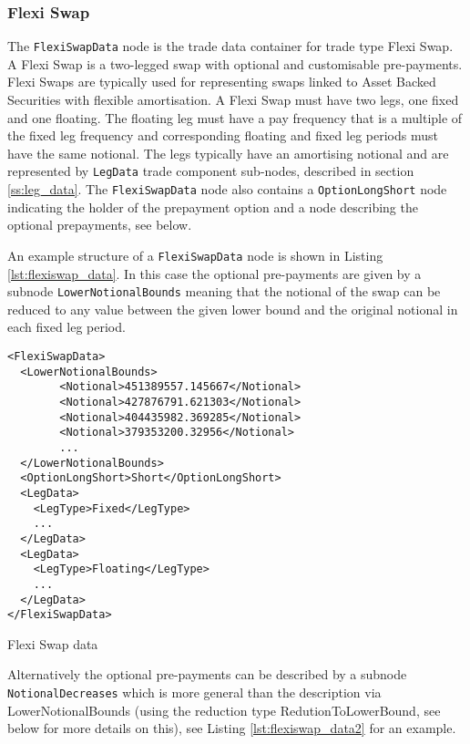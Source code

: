 \subsubsection{Flexi Swap}

The \lstinline!FlexiSwapData! node is the trade data container for trade type Flexi Swap. A Flexi Swap is a two-legged
swap with optional and customisable pre-payments. Flexi Swaps are typically used for representing swaps linked to Asset
Backed Securities with flexible amortisation. A Flexi Swap must have two legs, one fixed and one floating. The floating
leg must have a pay frequency that is a multiple of the fixed leg frequency and corresponding floating and fixed leg
periods must have the same notional. The legs typically have an amortising notional and are represented by
\lstinline!LegData! trade component sub-nodes, described in section \ref{ss:leg_data}. The \lstinline!FlexiSwapData!
node also contains a \lstinline!OptionLongShort! node indicating the holder of the prepayment option and a node
describing the optional prepayments, see below.

An example structure of a \lstinline!FlexiSwapData! node is shown in Listing \ref{lst:flexiswap_data}. In this case the
optional pre-payments are given by a subnode \lstinline!LowerNotionalBounds!  meaning that the notional of the swap can
be reduced to any value between the given lower bound and the original notional in each fixed leg period.

\begin{listing}[H]
\begin{verbatim}
<FlexiSwapData>
  <LowerNotionalBounds>
        <Notional>451389557.145667</Notional>
        <Notional>427876791.621303</Notional>
        <Notional>404435982.369285</Notional>
        <Notional>379353200.32956</Notional>
        ...
  </LowerNotionalBounds>
  <OptionLongShort>Short</OptionLongShort>
  <LegData>
    <LegType>Fixed</LegType>
    ...
  </LegData>
  <LegData>
    <LegType>Floating</LegType>
    ...
  </LegData>
</FlexiSwapData>
\end{verbatim}
\caption{Flexi Swap data}
\label{lst:flexiswap_data}
\end{listing}

Alternatively the optional pre-payments can be described by a subnode \lstinline!NotionalDecreases! which is more
general than the description via LowerNotionalBounds (using the reduction type RedutionToLowerBound, see below for more
details on this), see Listing \ref{lst:flexiswap_data2} for an example.

